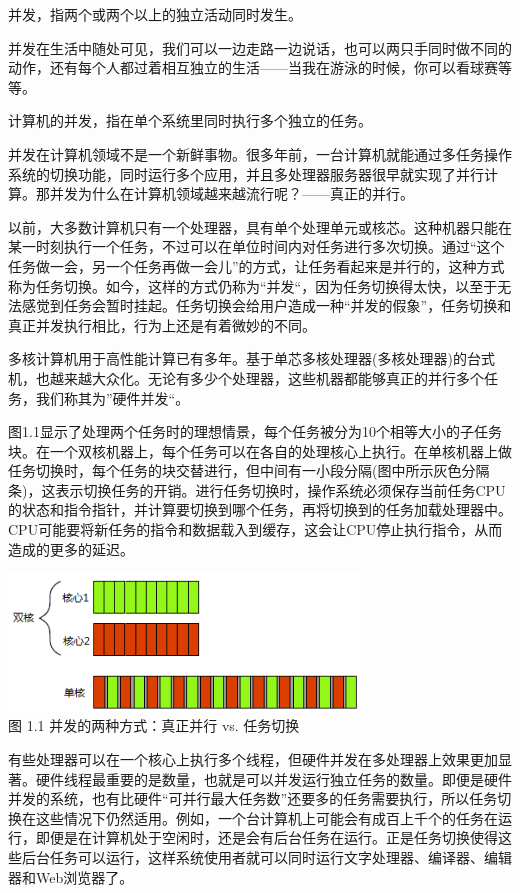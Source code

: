 并发，指两个或两个以上的独立活动同时发生。

并发在生活中随处可见，我们可以一边走路一边说话，也可以两只手同时做不同的动作，还有每个人都过着相互独立的生活——当我在游泳的时候，你可以看球赛等等。


计算机的并发，指在单个系统里同时执行多个独立的任务。

并发在计算机领域不是一个新鲜事物。很多年前，一台计算机就能通过多任务操作系统的切换功能，同时运行多个应用，并且多处理器服务器很早就实现了并行计算。那并发为什么在计算机领域越来越流行呢？——真正的并行。

以前，大多数计算机只有一个处理器，具有单个处理单元或核芯。这种机器只能在某一时刻执行一个任务，不过可以在单位时间内对任务进行多次切换。通过“这个任务做一会，另一个任务再做一会儿”的方式，让任务看起来是并行的，这种方式称为任务切换。如今，这样的方式仍称为“并发“，因为任务切换得太快，以至于无法感觉到任务会暂时挂起。任务切换会给用户造成一种“并发的假象”，任务切换和真正并发执行相比，行为上还是有着微妙的不同。

多核计算机用于高性能计算已有多年。基于单芯多核处理器(多核处理器)的台式机，也越来越大众化。无论有多少个处理器，这些机器都能够真正的并行多个任务，我们称其为”硬件并发“。

图1.1显示了处理两个任务时的理想情景，每个任务被分为10个相等大小的子任务块。在一个双核机器上，每个任务可以在各自的处理核心上执行。在单核机器上做任务切换时，每个任务的块交替进行，但中间有一小段分隔(图中所示灰色分隔条)，这表示切换任务的开销。进行任务切换时，操作系统必须保存当前任务CPU的状态和指令指针，并计算要切换到哪个任务，再将切换到的任务加载处理器中。CPU可能要将新任务的指令和数据载入到缓存，这会让CPU停止执行指令，从而造成的更多的延迟。

\begin{center}
    \includegraphics[width=0.7\textwidth]{content/chapter01/images/1-1.png}\\
    图 1.1 并发的两种方式：真正并行 vs. 任务切换
\end{center}

有些处理器可以在一个核心上执行多个线程，但硬件并发在多处理器上效果更加显著。硬件线程最重要的是数量，也就是可以并发运行独立任务的数量。即便是硬件并发的系统，也有比硬件“可并行最大任务数”还要多的任务需要执行，所以任务切换在这些情况下仍然适用。例如，一个台计算机上可能会有成百上千个的任务在运行，即便是在计算机处于空闲时，还是会有后台任务在运行。正是任务切换使得这些后台任务可以运行，这样系统使用者就可以同时运行文字处理器、编译器、编辑器和Web浏览器了。

